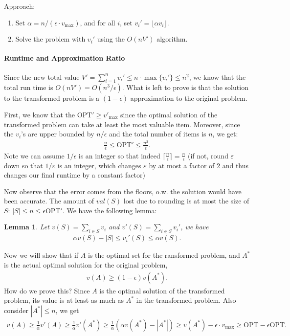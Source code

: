 \documentclass[11pt]{article}
\newcommand{\eps}{\varepsilon}
\newcommand{\opt}{\mathrm{OPT}}
\newtheorem{lemma}[theorem]{Lemma}
\theoremstyle{definition}
\theoremstyle{remark}
\begin{document}
Approach:
\begin{enumerate}[1.]
	\item Set $\alpha = n / (\epsilon \cdot v_{\max})$, and for all  $i$, set $v_i' = \lfloor \alpha v_i \rfloor $.
	\item Solve the problem with $v_i'$ using the $O(nV')$ algorithm.
\end{enumerate}

\paragraph{Runtime and Approximation Ratio}

Since the new total value $V' = \sum_{i=1}^n v_i' \leq n \cdot \max\{  v_i' \} \leq n^2$, we know that the total run time is $ O(nV') = O \left( n^3 / \epsilon \right)$.
%
What is left to prove is that the solution to the transformed problem is a $(1-\epsilon)$ approximation to the original problem. 


First, we know that the $\opt' \geq v'_{\max}$ since the optimal solution of the transformed problem can take at least the most valuable item. Moreover, since the $v_i$'s are upper bounded by $n/\epsilon$ and the total number of items is $n$, we get:
%
\begin{align*}
	\frac{n}{\epsilon} \leq \opt' \leq \frac{n^2}{\epsilon}.
\end{align*}
Note we can assume $1/\epsilon$ is an integer so that indeed $\lceil\frac n{\epsilon}\rceil = \frac n{\epsilon}$ (if not, round $\eps$ down so that $1/\eps$ is an integer, which changes $\eps$ by at most a factor of $2$ and thus changes our final runtime by a constant factor)

Now observe that the error comes from the floors, o.w. the solution would have been accurate. The amount of $val(S)$ lost due to rounding is at most the size of $S$: $|S| \leq n \leq \epsilon \opt'$. We have the following lemma:

%

\begin{lemma} 
Let  $v(S) = \sum_{i \in S} v_i$ and $v'(S) = \sum_{i \in S} v_i'$, we have
\begin{align*}
	\alpha v(S) - |S| \leq v_i'(S) \leq \alpha v(S).
\end{align*}
\end{lemma}

Now we will show that if $A$ is the optimal set for the ransformed problem, and $A^\ast$ is the actual optimal solution for the original problem, 
\begin{align*}
	v(A) \geq (1-\epsilon) v(A^\ast).
\end{align*}
How do we prove this? Since $A$ is the optimal solution of the transformed problem, its value is at least as much as $A^\ast$ in the transformed problem. Also consider $|A^\ast|\leq n$, we get
\begin{align*}
	v(A) \geq \frac{1}{\alpha} v'(A) \geq \frac{1}{\alpha}v'(A^\ast) \geq \frac{1}{\alpha}(\alpha v(A^\ast) - |A^\ast|) \geq v(A^\ast) - \epsilon \cdot v_{\max} \geq \opt - \epsilon \opt.
\end{align*}
\end{document}
